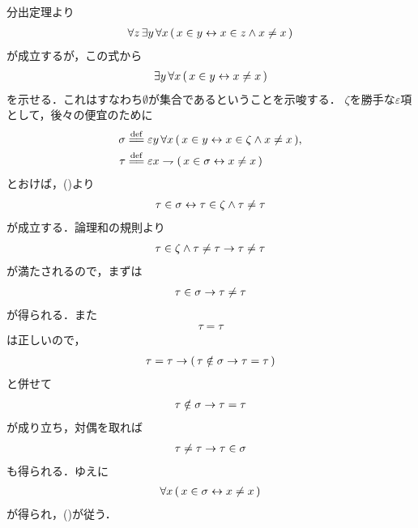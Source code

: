 	\begin{sketch}
		分出定理より
		\begin{align}
			\forall z\, \exists y\, \forall x\,
			(\, x \in y \leftrightarrow x \in z \wedge x \neq x\, )
			\label{fom:thm_emptyset_is_a_set_1}
		\end{align}
		が成立するが，この式から
		\begin{align}
			\exists y\, \forall x\, (\, x \in y \leftrightarrow x \neq x\, )
			\label{fom:thm_emptyset_is_a_set_2}
		\end{align}
		を示せる．これはすなわち$\emptyset$が集合であるということを示唆する．
		$\zeta$を勝手な$\varepsilon$項として，後々の便宜のために
		\begin{align}
			\sigma &\defeq \varepsilon y\, \forall x\,
			(\, x \in y \lrarrow x \in \zeta \wedge x \neq x\, ), \\
			\tau &\defeq \varepsilon x \rightharpoondown
			(\, x \in \sigma \lrarrow x \neq x\, )
		\end{align}
		とおけば，()より
		\begin{align}
			\tau \in \sigma \leftrightarrow \tau \in \zeta \wedge \tau \neq \tau
		\end{align}
		が成立する．論理和の規則より
		\begin{align}
			\tau \in \zeta \wedge \tau \neq \tau \rightarrow \tau \neq \tau
		\end{align}
		が満たされるので，まずは
		\begin{align}
			\tau \in \sigma \rightarrow \tau \neq \tau
		\end{align}
		が得られる．また
		\begin{align}
			\tau = \tau
		\end{align}
		は正しいので，
		\begin{align}
			\tau = \tau \rightarrow (\, \tau \notin \sigma \rightarrow
			\tau = \tau\, )
		\end{align}
		と併せて
		\begin{align}
			\tau \notin \sigma \rightarrow \tau = \tau
		\end{align}
		が成り立ち，対偶を取れば
		\begin{align}
			\tau \neq \tau \rightarrow \tau \in \sigma
		\end{align}
		も得られる．ゆえに
		\begin{align}
			\forall x\, (\, x \in \sigma \leftrightarrow x \neq x\, )
		\end{align}
		が得られ，()が従う．
		\QED
	\end{sketch}
	
